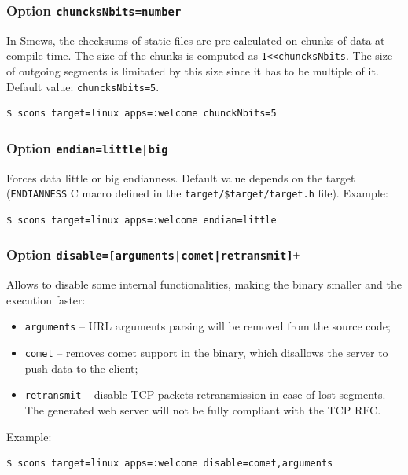 \documentclass{report}
\begin{document}
\subsubsection{Option {\tt chuncksNbits=number}}

In Smews, the checksums of static files are pre-calculated on chunks of data at compile time. The size of the chunks is computed as \verb+1<<chuncksNbits+. The size of outgoing segments is limitated by this size since it has to be multiple of it. Default value: \verb+chuncksNbits=5+.
\begin{verbatim}
$ scons target=linux apps=:welcome chunckNbits=5
\end{verbatim}

\subsubsection{Option {\tt endian=little|big}}

Forces data little or big endianness. Default value depends on the target (\verb+ENDIANNESS+ C macro defined in the \verb+target/$target/target.h+ file). Example:
\begin{verbatim}
$ scons target=linux apps=:welcome endian=little
\end{verbatim}

\subsubsection{Option {\tt disable=[arguments|comet|retransmit]+}}

Allows to disable some internal functionalities, making the binary smaller and the execution faster:
\begin{itemize}
\item \texttt{arguments} -- URL arguments parsing will be removed from the source code;
\item \texttt{comet} -- removes comet support in the binary, which disallows the server to push data to the client;
\item \texttt{retransmit} -- disable TCP packets retransmission in case of lost segments. The generated web server will not be fully compliant with the TCP RFC.
\end{itemize}

Example:
\begin{verbatim}
$ scons target=linux apps=:welcome disable=comet,arguments
\end{verbatim}
\end{document}
